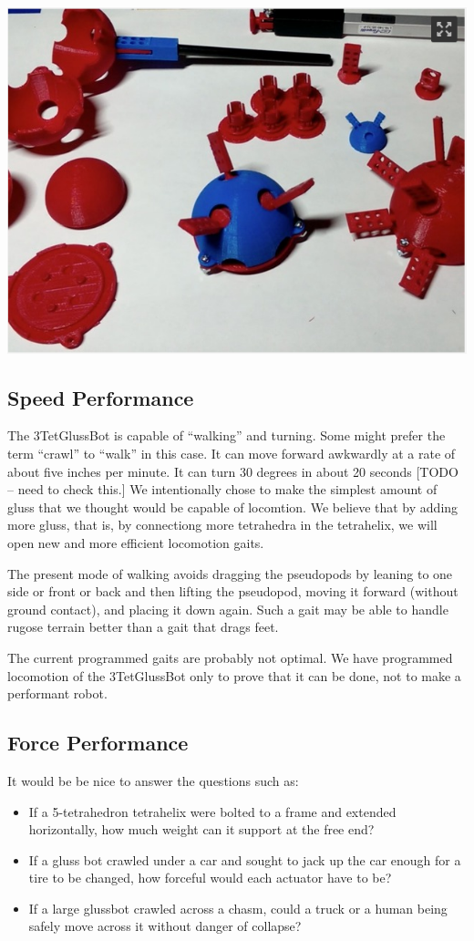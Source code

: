\documentclass[12pt]{article}
\begin{document}
\begin{itemize}
\includegraphics[scale=0.5]{TurretJointPieces.png}


\subsection{Speed Performance}

The 3TetGlussBot is capable of ``walking'' and turning. Some might prefer the term ``crawl'' to ``walk'' in
this case. It can move forward awkwardly at a rate
of about five inches per minute. It can turn 30 degrees in about 20 seconds [TODO -- need to check this.]
We intentionally chose to make the simplest amount of gluss that we thought would be capable of locomtion.
We believe that by adding more gluss, that is, by connectiong more tetrahedra in the tetrahelix,
we will open new and more efficient locomotion gaits.

The present mode of walking avoids dragging the pseudopods by leaning to one side or front or back and
then lifting the pseudopod, moving it forward (without ground contact), and placing it down again.
Such a gait may be able to handle rugose terrain better than a gait that drags feet.

The current programmed gaits are probably not optimal.
We have programmed locomotion of the 3TetGlussBot only to prove that it can be done, not to make
a performant robot.

\subsection{Force Performance}

It would be be nice to answer the questions such as:
\begin{itemize}  
\item If a 5-tetrahedron tetrahelix were bolted to a frame and extended horizontally, how much
  weight can it support at the free end?
\item If a gluss bot crawled under a car and sought to jack up the car enough for a tire
  to be changed, how forceful would each actuator have to be?
\item If a large glussbot crawled across a chasm, could a truck or a human being safely move
  across it without danger of collapse?
\end{itemize}


\end{itemize}
\end{document}
